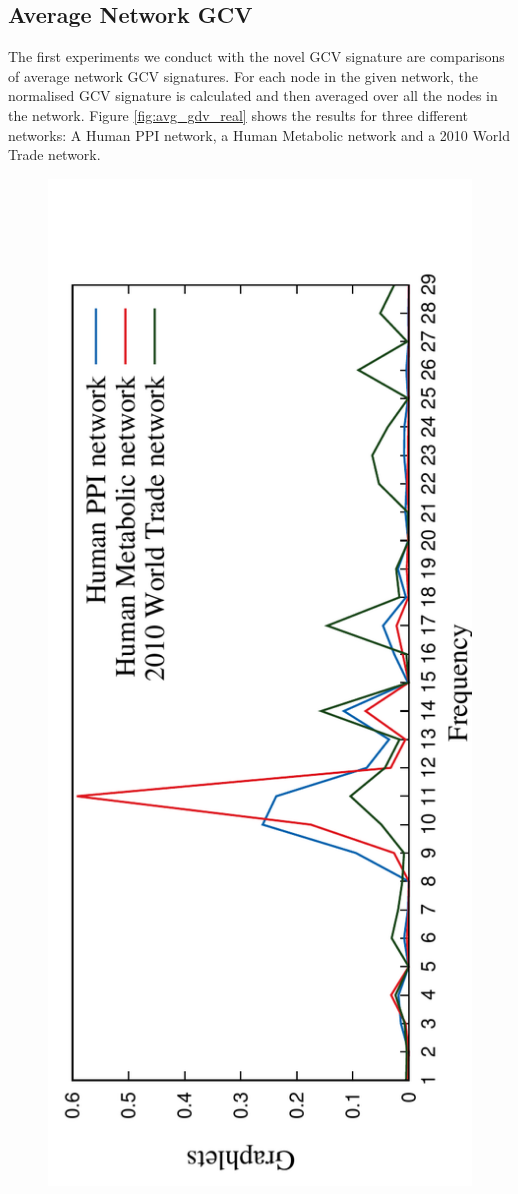 \subsection{Average Network GCV}

The first experiments we conduct with the novel GCV signature are comparisons of average network GCV signatures. For each node in the given network, the normalised GCV signature is calculated and then averaged over all the nodes in the network. Figure \ref{fig:avg_gdv_real} shows the results for three different networks: A Human PPI network, a Human Metabolic network and a 2010 World Trade network. 


\begin{figure}[h]
  \centering
  \includegraphics[scale=0.7, angle=-90]{../code/final_results/all_nets_average2.pdf}

\end{figure}
